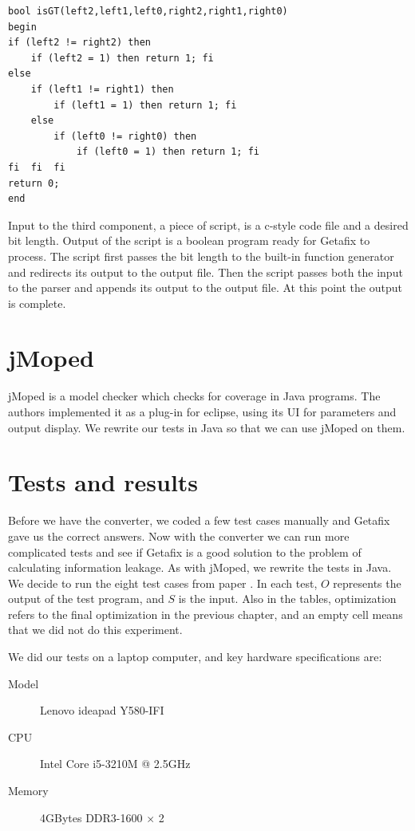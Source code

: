 \lstset{language=C}  
\begin{lstlisting}[float=h, caption={Greater than operator as a function in boolean program with bit length of 2.},label=lst:isGT]
bool isGT(left2,left1,left0,right2,right1,right0)
begin
if (left2 != right2) then
	if (left2 = 1) then return 1; fi
else 
	if (left1 != right1) then
		if (left1 = 1) then	return 1; fi
	else 
		if (left0 != right0) then
			if (left0 = 1) then	return 1; fi
fi	fi	fi
return 0;
end
\end{lstlisting}

Input to the third component, a piece of script, is a c-style code file and a desired bit length. Output of the script is a boolean program ready for Getafix to process. The script first passes the bit length to the built-in function generator and redirects its output to the output file. Then the script passes both the input to the parser and appends its output to the output file. At this point the output is complete.

\section {jMoped}
jMoped is a model checker which checks for coverage in Java programs. The authors implemented it as a plug-in for eclipse, using its UI for parameters and output display. We rewrite our tests in Java so that we can use jMoped on them.

\section{Tests and results}
Before we have the converter, we coded a few test cases manually and Getafix gave us the correct answers. Now with the converter we can run more complicated tests and see if Getafix is a good solution to the problem of calculating information leakage. As with jMoped, we rewrite the tests in Java. We decide to run the eight test cases from paper \cite{meng_calculating_2011}. In each test, $O$ represents the output of the test program, and $S$ is the input. Also in the tables, optimization refers to the final optimization in the previous chapter, and an empty cell means that we did not do this experiment.

We did our tests on a laptop computer, and key hardware specifications are:
\begin{description}
  \item[Model] Lenovo ideapad Y580-IFI
  \item[CPU] Intel Core i5-3210M @ 2.5GHz
  \item[Memory] 4GBytes DDR3-1600 $\times$ 2
\end{description}

